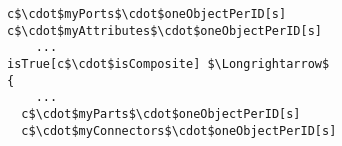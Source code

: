 \lstset{frame=tb, aboveskip=12pt, belowskip=-3pt, breaklines=true, basicstyle=\small\ttfamily, tabsize=2, mathescape=true}
\begin{lstlisting}[caption={wellformed\_components.als, lines 29-40}, label=alloy:WF_COMPONENT_ONE_CONSTITUENT_PER_UUID, captionpos=b]
c$\cdot$myPorts$\cdot$oneObjectPerID[s]
c$\cdot$myAttributes$\cdot$oneObjectPerID[s]
    ...
isTrue[c$\cdot$isComposite] $\Longrightarrow$
{
    ...
  c$\cdot$myParts$\cdot$oneObjectPerID[s]
  c$\cdot$myConnectors$\cdot$oneObjectPerID[s]
\end{lstlisting}